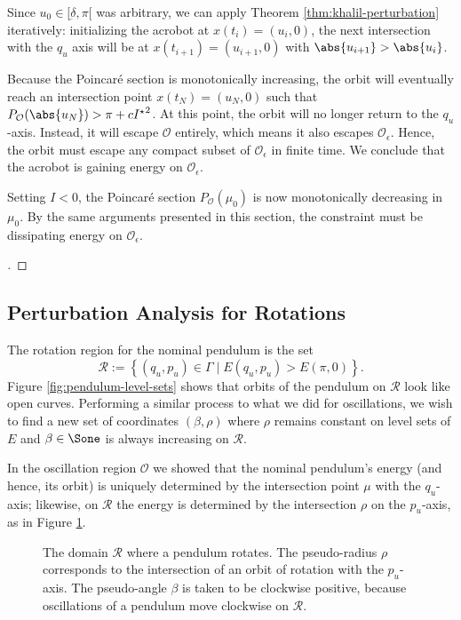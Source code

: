 Since \(u_0 \in [\underbar{\delta},\pi[\) was arbitrary, 
we can apply Theorem \ref{thm:khalil-perturbation} iteratively:
initializing the acrobot at \(x(t_i) = (u_i, 0)\), the
next intersection with the \(q_u\) axis will be at
\(x(t_{i+1}) = (u_{i+1},0)\) with \(\abs{u_{i+1}} > \abs{u_i}\).

Because the Poincar\'{e} section is monotonically increasing, 
the orbit will eventually reach an intersection point \(x(t_N) = (u_N,0)\)
such that \(P_\mathcal{O}(\abs{u_N}) > \pi + c{I^\star}^2\). 
At this point, the orbit will no longer return to the
\(q_u\)-axis.
Instead, it will escape \(\mathcal{O}\) entirely, which means
it also escapes \(\mathcal{O}_\epsilon\).
Hence, the orbit must escape any compact subset of 
\(\mathcal{O}_\epsilon\) in finite time. 
We conclude that the acrobot is gaining energy on \(\mathcal{O}_\epsilon\).

Setting \(I < 0\), the Poincar\'{e} section \(P_\mathcal{O}(\mu_0)\) is now
monotonically decreasing in \(\mu_0\).
By the same arguments presented in this section, the constraint 
must be dissipating energy on \(\mathcal{O}_\epsilon\).

\begin{proof}[\unskip\nopunct]
\end{proof}

\subsection*{Perturbation Analysis for Rotations}
The rotation region for the nominal pendulum is the set
\[
    \mathcal{R} := \left\{ (q_u,p_u) \in \Gamma \mid E(q_u,p_u) > E(\pi,0)\right\}
    .
\]
Figure \ref{fig:pendulum-level-sets} shows that orbits of the 
pendulum on \(\mathcal{R}\) look like open curves.
Performing a similar process to what we did for oscillations,
we wish to find a new set of coordinates \((\beta,\rho)\)
where \(\rho\) remains constant on level sets of \(E\)
and \(\beta \in \Sone\) is always increasing on \(\mathcal{R}\).

In the oscillation region \(\mathcal{O}\) we showed that the nominal pendulum's
energy (and hence, its orbit) is uniquely determined by the intersection point
\(\mu\) with the \(q_u\)-axis;
likewise, on \(\mathcal{R}\) the energy is determined by the
intersection \(\rho\) on the \(p_u\)-axis, as in Figure
\ref{fig:rho-intersection}.

\begin{figure}
    \centering
    \caption{The domain \(\mathcal{R}\) where a pendulum rotates. The
        pseudo-radius \(\rho\) corresponds to the intersection of an orbit of
        rotation with the \(p_u\)-axis. The pseudo-angle \(\beta\) is taken to
        be clockwise positive, because oscillations of a pendulum move clockwise
        on \(\mathcal{R}\).}
    \label{fig:rho-intersection}
\end{figure}

